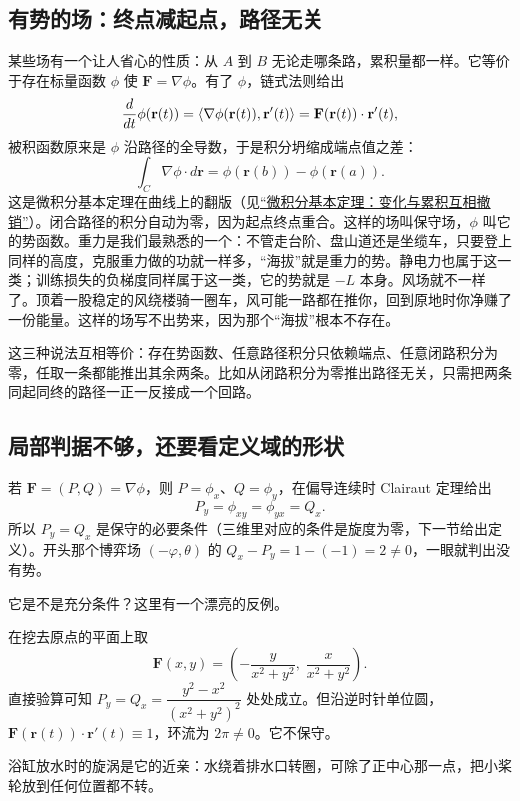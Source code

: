 \subsection{有势的场：终点减起点，路径无关}

某些场有一个让人省心的性质：从 \(A\) 到 \(B\) 无论走哪条路，累积量都一样。它等价于存在标量函数 \(\phi\) 使 \(\mathbf F=\nabla\phi\)。有了 \(\phi\)，链式法则给出
\[
\frac{d}{dt}\phi(\mathbf r(t))=\left\langle\nabla\phi(\mathbf r(t)),\mathbf r'(t)\right\rangle=\mathbf F(\mathbf r(t))\cdot\mathbf r'(t),
\]
被积函数原来是 \(\phi\) 沿路径的全导数，于是积分坍缩成端点值之差：
\[
\int_C\nabla\phi\cdot d\mathbf r=\phi(\mathbf r(b))-\phi(\mathbf r(a)).
\]
这是微积分基本定理在曲线上的翻版（见\hyperref[sec:02-Calculus/04-Integration/02]{``微积分基本定理：变化与累积互相撤销''}）。闭合路径的积分自动为零，因为起点终点重合。这样的场叫保守场，\(\phi\) 叫它的势函数。重力是我们最熟悉的一个：不管走台阶、盘山道还是坐缆车，只要登上同样的高度，克服重力做的功就一样多，``海拔''就是重力的势。静电力也属于这一类；训练损失的负梯度同样属于这一类，它的势就是 \(-L\) 本身。风场就不一样了。顶着一股稳定的风绕楼骑一圈车，风可能一路都在推你，回到原地时你净赚了一份能量。这样的场写不出势来，因为那个``海拔''根本不存在。

这三种说法互相等价：存在势函数、任意路径积分只依赖端点、任意闭路积分为零，任取一条都能推出其余两条。比如从闭路积分为零推出路径无关，只需把两条同起同终的路径一正一反接成一个回路。

\subsection{局部判据不够，还要看定义域的形状}

若 \(\mathbf F=(P,Q)=\nabla\phi\)，则 \(P=\phi_x\)、\(Q=\phi_y\)，在偏导连续时 Clairaut 定理给出
\[
P_y=\phi_{xy}=\phi_{yx}=Q_x .
\]
所以 \(P_y=Q_x\) 是保守的必要条件（三维里对应的条件是旋度为零，下一节给出定义）。开头那个博弈场 \((-\varphi,\theta)\) 的 \(Q_x-P_y=1-(-1)=2\ne0\)，一眼就判出没有势。

它是不是充分条件？这里有一个漂亮的反例。

\begin{example}
在挖去原点的平面上取
\[
\mathbf F(x,y)=\left(-\frac{y}{x^2+y^2},\;\frac{x}{x^2+y^2}\right).
\]
直接验算可知 \(P_y=Q_x=\dfrac{y^2-x^2}{(x^2+y^2)^2}\) 处处成立。但沿逆时针单位圆，\(\mathbf F(\mathbf r(t))\cdot\mathbf r'(t)\equiv1\)，环流为 \(2\pi\ne0\)。它不保守。
\end{example}

浴缸放水时的旋涡是它的近亲：水绕着排水口转圈，可除了正中心那一点，把小桨轮放到任何位置都不转。

